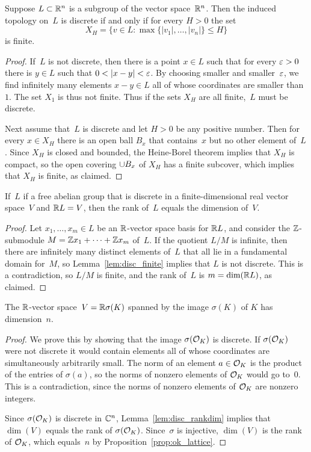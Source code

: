 \begin{lemma}\label{lem:disc_finite}
Suppose $L\subset \mathbb{R}^n$ is a subgroup of the vector space~$\mathbb{R}^n$.
Then the induced topology on~$L$ is discrete if and only
if for every  $H>0$ the set 
$$
  X_H = \{v \in L : \max\{|v_1|,\ldots, |v_n|\} \leq H \}
$$
is finite. 
\end{lemma}
\begin{proof}
If~$L$ is not discrete, then there is a point $x \in L$ such that
for every $\varepsilon>0$ there is $y\in L$ such that
$0 < |x-y|<\varepsilon$. By choosing smaller and smaller~$\varepsilon$,
we find infinitely many elements $x-y\in L$
all of whose coordinates are smaller than~$1$. 
The set $X_1$ is thus not finite.   Thus if the sets
$X_H$ are all finite,~$L$ must be discrete. 

Next assume that~$L$ is discrete and let $H>0$ be any positive number.
Then for every $x\in X_H$ there is an open ball $B_x$ that
contains~$x$ but no other element of~$L$.  Since $X_H$ is closed and
bounded, the Heine-Borel theorem implies that $X_H$ is compact, so the
open covering $\cup B_x$ of $X_H$ has a finite subcover, which
implies that $X_H$ is finite, as claimed.
\end{proof}

\begin{lemma}\label{lem:disc_rankdim}
If~$L$ if a free abelian group that is
discrete in a finite-dimensional
real vector space~$V$ and $\mathbb{R}{}L=V$, then the rank of~$L$ 
equals the dimension of~$V$.  
\end{lemma}
\begin{proof}
  Let $x_1,\ldots, x_m \in L$ be an $\mathbb{R}$-vector space basis for
  $\mathbb{R}{}L$, and consider the $\mathbb{Z}$-submodule $M=\mathbb{Z} x_1 + \cdots + \mathbb{Z}
  x_m$ of~$L$.  If the quotient $L/M$ is infinite, then there are
  infinitely many distinct elements of~$L$ that all lie in a
  fundamental domain for~$M$, so Lemma~\ref{lem:disc_finite} implies
  that $L$ is not discrete.  This is a contradiction, so $L/M$ is
  finite, and the rank of~$L$ is $m=\dim(\mathbb{R}{}L)$, as claimed.
\end{proof}

\begin{proposition}
The $\mathbb{R}$-vector space~$V=\mathbb{R}\sigma(K)$ spanned by the image
$\sigma(K)$ of $K$ has dimension~$n$.
\end{proposition}
\begin{proof}
We prove this by showing that the image $\sigma(\mathcal{O}_K)$ is discrete. If
$\sigma(\mathcal{O}_K)$ were not discrete it would contain elements all of
whose coordinates are simultaneously arbitrarily small.  The norm of
an element $a\in \mathcal{O}_K$ is the product of the entries of $\sigma(a)$,
so the norms of nonzero elements of $\mathcal{O}_K$ would go to~$0$.  This is a
contradiction, since the norms of nonzero elements of $\mathcal{O}_K$ are
 nonzero integers.

Since $\sigma(\mathcal{O}_K)$ is discrete in $\mathbb{C}^n$, Lemma~\ref{lem:disc_rankdim}
implies that $\dim(V)$ equals the rank of $\sigma(\mathcal{O}_K)$.  Since~$\sigma$
is injective, $\dim(V)$ is the rank of $\mathcal{O}_K$, which equals~$n$ by
Proposition~\ref{prop:ok_lattice}.
\end{proof}


